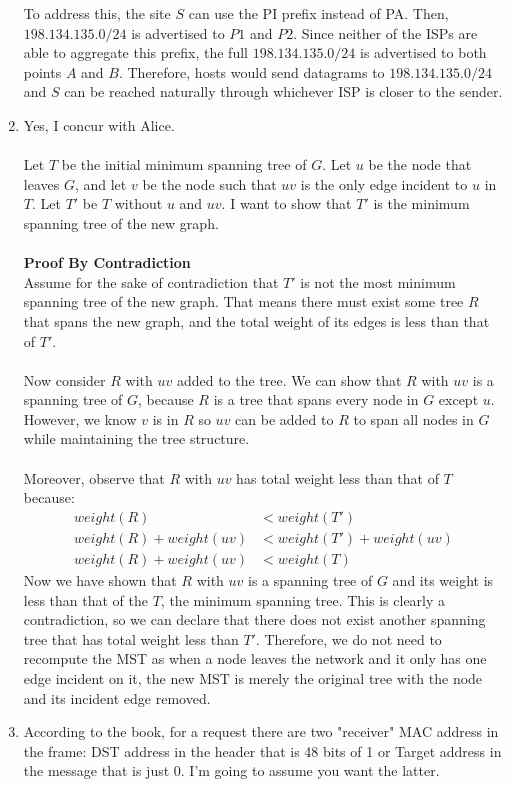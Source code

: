 \documentclass[12pt]{article}
\begin{document}
\begin{enumerate}
	To address this, the site $S$ can use the PI prefix instead of PA. Then, $198.134.135.0/24$ is advertised to $P1$ and $P2$. Since neither of the ISPs are able to aggregate this prefix, the full $198.134.135.0/24$ is advertised to both points $A$ and $B$. Therefore, hosts would send datagrams to $198.134.135.0/24$ and $S$ can be reached naturally through whichever ISP is closer to the sender. 
	\item Yes, I concur with Alice. \\ \\Let $T$ be the initial minimum spanning tree of $G$. Let $u$ be the node that leaves $G$, and let $v$ be the node such that $uv$ is the only edge incident to $u$ in $T$. Let $T'$ be $T$ without $u$ and $uv$. I want to show that $T'$ is the minimum spanning tree of the new graph. \\ \\ \textbf{Proof By Contradiction} \\ Assume for the sake of contradiction that $T'$ is not the most minimum spanning tree of the new graph. That means there must exist some tree $R$ that spans the new graph, and the total weight of its edges is less than that of $T'$. \\ \\ Now consider $R$ with $uv$ added to the tree. We can show that $R$ with $uv$ is a spanning tree of $G$, because $R$ is a tree that spans every node in $G$ except $u$. However, we know $v$ is in $R$ so $uv$ can be added to $R$ to span all nodes in $G$ while maintaining the tree structure. \\ \\ Moreover, observe that $R$ with $uv$ has total weight less than that of $T$ because:
	\begin{align*}
	weight(R) &< weight(T')\\
	weight(R) + weight(uv) &< weight(T') + weight(uv)\\
	weight(R) + weight(uv) &< weight(T)
	\end{align*}
	Now we have shown that $R$ with $uv$ is a spanning tree of $G$ and its weight is less than that of the $T$, the minimum spanning tree. This is clearly a contradiction, so we can declare that there does not exist another spanning tree that has total weight less than $T'$. Therefore, we do not need to recompute the MST as when a node leaves the network and it only has one edge incident on it, the new MST is merely the original tree with the node and its incident edge removed.
	\item
        According to the book, for a request there are two "receiver" MAC address in the frame:
        DST address in the header that is 48 bits of 1 or Target address in the message
        that is just 0. I'm going to assume you want the latter. \\


\end{enumerate}
\end{document}
